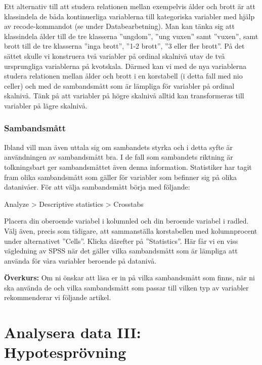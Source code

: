 \documentclass[
]{book}
\begin{document}
Ett alternativ till att studera relationen mellan exempelvis ålder och brott är att klassindela de
båda kontinuerliga variablerna till kategoriska variabler med hjälp av recode-kommandot (se under
Databearbetning). Man kan tänka sig att klassindela ålder till de tre klasserna ''ungdom'', ''ung vuxen''
samt ''vuxen'', samt brott till de tre klasserna ''inga brott'', ''1-2 brott'', ''3 eller fler brott''. På det sättet
skulle vi konstruera två variabler på ordinal skalnivå utav de två ursprungliga variablerna på kvotskala.
Därmed kan vi med de nya variablerna studera relationen mellan ålder och brott i en korstabell (i detta
fall med nio celler) och med de sambandsmått som är lämpliga för variabler på ordinal skalnivå. Tänk på
att variabler på högre skalnivå alltid kan transformeras till variabler på lägre skalnivå.

\hypertarget{sambandsmuxe5tt}{%
\section{Sambandsmått}\label{sambandsmuxe5tt}}

Ibland vill man även uttala sig om sambandets styrka och i detta syfte är användningen av sambandsmått bra. I de fall som sambandets riktning är tolkningsbart ger sambandsmåttet även denna information. Statistiker har tagit fram olika sambandsmått som gäller för variabler som befinner sig på olika datanivåer. För att välja sambandsmått börja med följande:

Analyze \textgreater{} Descriptive statistics \textgreater{} Crosstabs

Placera din oberoende variabel i kolumnled och din beroende variabel i radled. Välj även, precis som
tidigare, att sammanställa korstabellen med kolumnprocent under alternativet ''Cells''. Klicka därefter
på ''Statistics''. Här får vi en viss vägledning av SPSS när det gäller vilka sambandsmått som är lämpliga att använda för våra variabler beroende på datanivå.

\textbf{Överkurs:}
Om ni önskar att läsa er in på vilka sambandsmått som finns, när ni ska använda de och vilka sambandsmått som passar till vilken typ av variabler rekommenderar vi följande artikel.

\hypertarget{part-analysera-data-iii-hypotespruxf6vning}{%
\part*{Analysera data III: Hypotesprövning}\label{part-analysera-data-iii-hypotespruxf6vning}}
\end{document}
